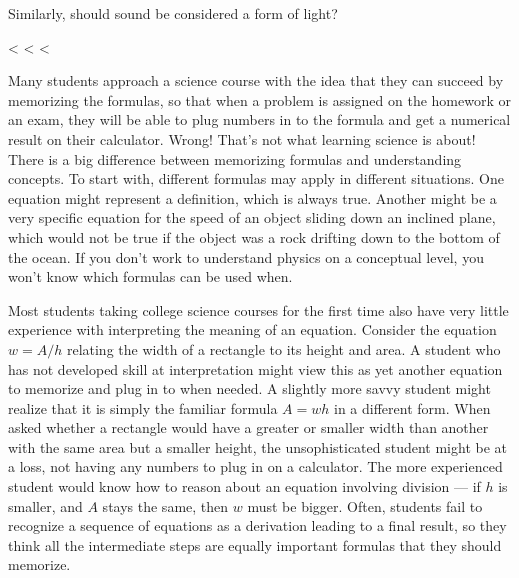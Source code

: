 \begin{dq}
Similarly, should sound be considered a form of light?
\end{dq}

<%
<%
<%


Many students approach a science course with the idea that
they can succeed by memorizing the formulas, so that when a
problem is assigned on the homework or an exam, they will be
able to plug numbers in to the formula and get a numerical
result on their calculator. Wrong! That's not what learning
science is about! There is a big difference between
memorizing formulas and understanding concepts. To start
with, different formulas may apply in different situations.
One equation might represent a definition, which is always
true. Another might be a very specific equation for the
speed of an object sliding down an inclined plane, which
would not be true if the object was a rock drifting down to
the bottom of the ocean. If you don't work to understand
physics on a conceptual level, you won't know which
formulas can be used when.

Most students taking college science courses for the first
time also have very little experience with interpreting the
meaning of an equation. Consider the equation $w=A/h$
relating the width of a rectangle to its height and area. A
student who has not developed skill at interpretation might
view this as yet another equation to memorize and plug in to
when needed. A slightly more savvy student might realize
that it is simply the familiar formula $A=wh$ in a
different form. When asked whether a rectangle would have a
greater or smaller width than another with the same area but
a smaller height, the unsophisticated student might be at a
loss, not having any numbers to plug in on a calculator. The
more experienced student would know how to reason about an
equation involving division --- if $h$ is smaller, and $A$
stays the same, then $w$ must be bigger. Often, students
fail to recognize a sequence of equations as a derivation
leading to a final result, so they think all the intermediate
steps are equally important formulas that they should memorize.

